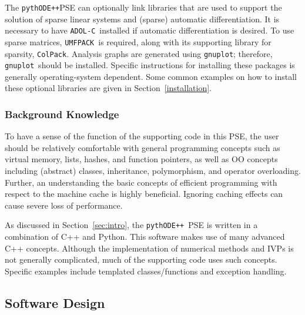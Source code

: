 \documentclass[11pt]{article}
\newcommand{\pypp}{\texttt{pythODE++}}
\newcommand{\adolc}{\texttt{ADOL-C}}
\newcommand{\umfpack}{\texttt{UMFPACK}}
\newcommand{\colpack}{\texttt{ColPack}}
\newcommand{\gnuplot}{\texttt{gnuplot}}
\begin{document}
The \pypp PSE can optionally link libraries that are used to support
the solution of sparse linear systems and (sparse) automatic
differentiation.  It is necessary to have \adolc\ installed if
automatic differentiation is desired. To use sparse matrices,
\umfpack\ is required, along with its supporting library for sparsity,
\colpack. Analysis graphs are generated using \gnuplot; therefore,
\gnuplot\ should be installed. Specific instructions for installing
these packages is generally operating-system dependent. Some common
examples on how to install these optional libraries are given in
Section~\ref{installation}.

\subsubsection{Background Knowledge}

To have a sense of the function of the supporting code in this PSE,
the user should be relatively comfortable with general programming
concepts such as virtual memory, lists, hashes, and function pointers,
as well as \ac{OO} concepts including (abstract) classes, inheritance,
polymorphism, and operator overloading.  Further, an understanding the
basic concepts of efficient programming with respect to the machine
cache is highly beneficial. Ignoring caching effects can cause severe
loss of performance.

As discussed in Section~\ref{sec:intro}, the \pypp\ \ac{PSE} is
written in a combination of C++ and Python.  This software makes use
of many advanced C++ concepts.  Although the implementation of
numerical methods and \acp{IVP} is not generally complicated, much of
the supporting code uses such concepts.  Specific examples include
templated classes/functions and exception handling.

\subsection{Software Design}
\end{document}
